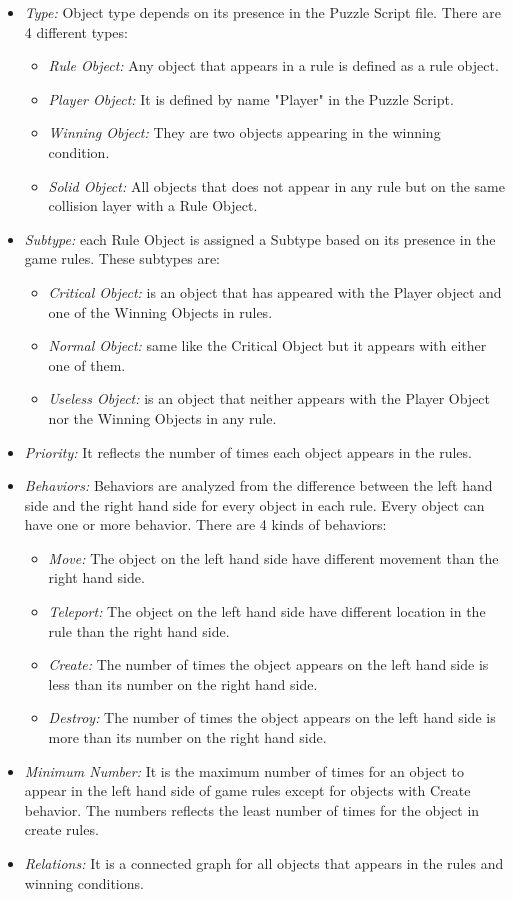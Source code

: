 \documentclass[letterpaper]{article}
\begin{document}
\begin{itemize}
	\item \emph{Type:} Object type depends on its presence in the Puzzle Script file. There are 4 different types:
	\begin{itemize}
		\item \emph{Rule Object:} Any object that appears in a rule is defined as a rule object.
		\item \emph{Player Object:} It is defined by name "Player" in the Puzzle Script.
		\item \emph{Winning Object:} They are two objects appearing in the winning condition.
		\item \emph{Solid Object:} All objects that does not appear in any rule but on the same collision layer with a Rule Object.
	\end{itemize}
	\item \emph{Subtype:} each Rule Object is assigned a Subtype based on its presence in the game rules. These subtypes are:
	\begin{itemize}
		\item \emph{Critical Object:} is an object that has appeared with the Player object and one of the Winning Objects in rules.
		\item \emph{Normal Object:} same like the Critical Object but it appears with either one of them.
		\item \emph{Useless Object:} is an object that neither appears with the Player Object nor the Winning Objects in any rule.
	\end{itemize}
	\item \emph{Priority:} It reflects the number of times each object appears in the rules.
	\item \emph{Behaviors:} Behaviors are analyzed from the difference between the left hand side and the right hand side for every object in each rule. Every object can have one or more behavior. There are 4 kinds of behaviors:
		\begin{itemize}
			\item \emph{Move:} The object on the left hand side have different movement than the right hand side.
			\item \emph{Teleport:} The object on the left hand side have different location in the rule than the right hand side.
			\item \emph{Create:} The number of times the object appears on the left hand side is less than its number on the right hand side.
			\item \emph{Destroy:} The number of times the object appears on the left hand side is more than its number on the right hand side.
		\end{itemize}
	\item \emph{Minimum Number:} It is the maximum number of times for an object to appear in the left hand side of game rules except for objects with Create behavior. The numbers reflects the least number of times for the object in create rules.
	\item \emph{Relations:} It is a connected graph for all objects that appears in the rules and winning conditions.
\end{itemize}
\end{document}

